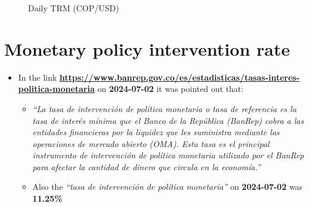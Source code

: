 \documentclass[
  ignorenonframetext,
]{beamer}
\begin{document}
\begin{frame}{}
\label{section-13}
\begin{figure}


\caption{\label{fig-daily-trm-cop-usd}Daily TRM (COP/USD)}

\end{figure}%
\end{frame}

\section{Monetary policy intervention
rate}\label{monetary-policy-intervention-rate}

\begin{frame}{}
\label{section-14}
\begin{itemize}
\item
  In the link
  \href{https://www.banrep.gov.co/es/estadisticas/tasas-interes-politica-monetaria}{\textbf{https://www.banrep.gov.co/es/estadisticas/tasas-interes-politica-monetaria}}
  on \textbf{2024-07-02} it was pointed out that:

  \begin{itemize}
  \item
    \emph{``La tasa de intervención de política monetaria o tasa de
    referencia es la tasa de interés mínima que el Banco de la República
    (BanRep) cobra a las entidades financieras por la liquidez que les
    suministra mediante las operaciones de mercado abierto (OMA). Esta
    tasa es el principal instrumento de intervención de política
    monetaria utilizado por el BanRep para afectar la cantidad de dinero
    que circula en la economía.''}
  \item
    Also the \emph{``tasa de intervención de política monetaria''} on
    \textbf{2024-07-02} was \textbf{11.25\%}
  \end{itemize}
\end{itemize}
\end{frame}
\end{document}
